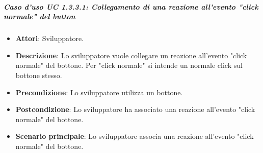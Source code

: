 \subparagraph{Caso d'uso UC 1.3.3.1: Collegamento di una reazione all'evento "click normale" del button}

\FloatBarrier
\begin{itemize}
\item\textbf{Attori}: Sviluppatore.
\item\textbf{Descrizione}: Lo sviluppatore vuole collegare un reazione all'evento "click normale" del bottone. Per "click normale" si intende un normale click sul bottone stesso.
\item\textbf{Precondizione}: Lo sviluppatore utilizza un bottone.
\item\textbf{Postcondizione}: Lo sviluppatore ha associato una reazione all'evento "click normale" del bottone.
\item\textbf{Scenario principale}: Lo sviluppatore associa una reazione all'evento "click normale" del bottone.
\end{itemize}
